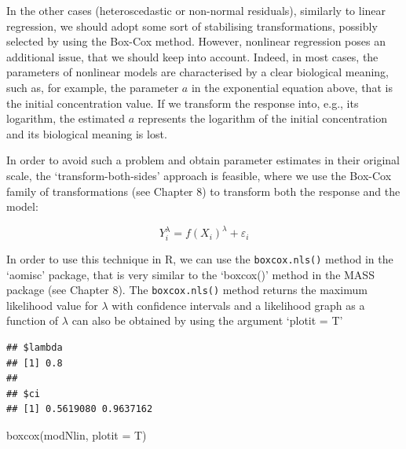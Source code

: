 \documentclass[a4paper,12pt,oneside]{book}
\newenvironment{Shaded}{\begin{snugshade}}{\end{snugshade}}
\newcommand{\SpecialCharTok}[1]{#1}
\newcommand{\OtherTok}[1]{#1}
\newcommand{\FunctionTok}[1]{#1}
\newcommand{\AttributeTok}[1]{#1}
\newcommand{\NormalTok}[1]{#1}
\begin{document}
In the other cases (heteroscedastic or non-normal residuals), similarly to linear regression, we should adopt some sort of stabilising transformations, possibly selected by using the Box-Cox method. However, nonlinear regression poses an additional issue, that we should keep into account. Indeed, in most cases, the parameters of nonlinear models are characterised by a clear biological meaning, such as, for example, the parameter \(a\) in the exponential equation above, that is the initial concentration value. If we transform the response into, e.g., its logarithm, the estimated \(a\) represents the logarithm of the initial concentration and its biological meaning is lost.

In order to avoid such a problem and obtain parameter estimates in their original scale, the `transform-both-sides' approach is feasible, where we use the Box-Cox family of transformations (see Chapter 8) to transform both the response and the model:

\[Y_i^\lambda  = f(X_i)^\lambda + \varepsilon_i\]

In order to use this technique in R, we can use the \texttt{boxcox.nls()} method in the `aomisc' package, that is very similar to the `boxcox()' method in the MASS package (see Chapter 8). The \texttt{boxcox.nls()} method returns the maximum likelihood value for \(\lambda\) with confidence intervals and a likelihood graph as a function of \(\lambda\) can also be obtained by using the argument `plotit = T'

\vspace{12pt}

\begin{Shaded}
\end{Shaded}

\begin{verbatim}
## $lambda
## [1] 0.8
## 
## $ci
## [1] 0.5619080 0.9637162
\end{verbatim}

\begin{Shaded}
\begin{Highlighting}[]
\FunctionTok{boxcox}\NormalTok{(modNlin, }\AttributeTok{plotit =}\NormalTok{ T)}
\end{Highlighting}
\end{Shaded}
\end{document}
